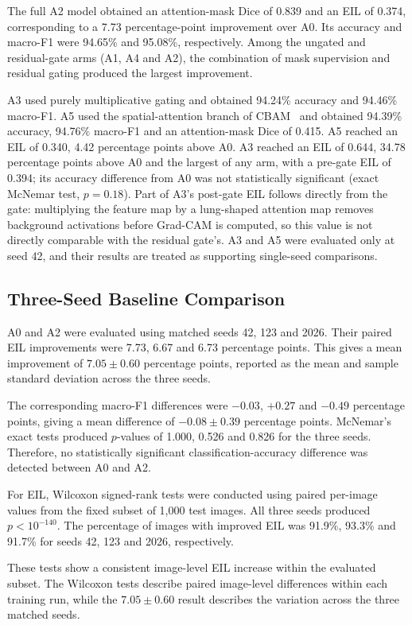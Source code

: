\documentclass[sigconf,screen,nonacm]{acmart}
\begin{document}
The full A2 model obtained an attention-mask Dice of 0.839 and an EIL of 0.374, corresponding to a 7.73 percentage-point improvement over A0. Its accuracy and macro-F1 were 94.65\% and 95.08\%, respectively. Among the ungated and residual-gate arms (A1, A4 and A2), the combination of mask supervision and residual gating produced the largest improvement.

A3 used purely multiplicative gating and obtained 94.24\% accuracy and 94.46\% macro-F1. A5 used the spatial-attention branch of CBAM~\cite{woo2018cbam} and obtained 94.39\% accuracy, 94.76\% macro-F1 and an attention-mask Dice of 0.415. A5 reached an EIL of 0.340, 4.42 percentage points above A0. A3 reached an EIL of 0.644, 34.78 percentage points above A0 and the largest of any arm, with a pre-gate EIL of 0.394; its accuracy difference from A0 was not statistically significant (exact McNemar test, $p=0.18$). Part of A3's post-gate EIL follows directly from the gate: multiplying the feature map by a lung-shaped attention map removes background activations before Grad-CAM is computed, so this value is not directly comparable with the residual gate's. A3 and A5 were evaluated only at seed 42, and their results are treated as supporting single-seed comparisons.

\subsection{Three-Seed Baseline Comparison}

A0 and A2 were evaluated using matched seeds 42, 123 and 2026. Their paired EIL improvements were 7.73, 6.67 and 6.73 percentage points. This gives a mean improvement of $7.05\pm0.60$ percentage points, reported as the mean and sample standard deviation across the three seeds.

The corresponding macro-F1 differences were $-0.03$, $+0.27$ and $-0.49$ percentage points, giving a mean difference of $-0.08\pm0.39$ percentage points. McNemar's exact tests produced $p$-values of 1.000, 0.526 and 0.826 for the three seeds. Therefore, no statistically significant classification-accuracy difference was detected between A0 and A2.

For EIL, Wilcoxon signed-rank tests were conducted using paired per-image values from the fixed subset of 1,000 test images. All three seeds produced $p<10^{-140}$. The percentage of images with improved EIL was 91.9\%, 93.3\% and 91.7\% for seeds 42, 123 and 2026, respectively.

These tests show a consistent image-level EIL increase within the evaluated subset. The Wilcoxon tests describe paired image-level differences within each training run, while the $7.05\pm0.60$ result describes the variation across the three matched seeds.
\end{document}
